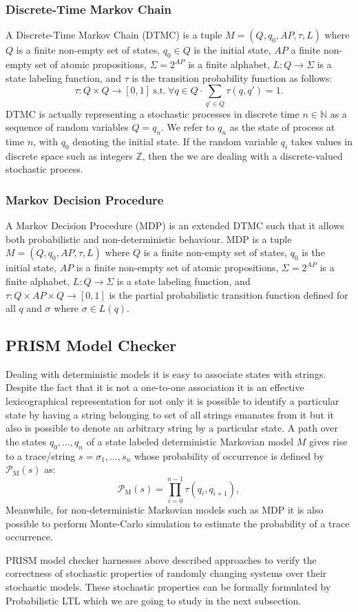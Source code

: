 \documentclass[
a4paper,
12pt
]{scrartcl}
\newcommand\Prob[1]{ \operatorname {\mathcal{P}_{#1}}}
\begin{document}
\subsubsection{Discrete-Time Markov Chain}
\par A Discrete-Time Markov Chain (DTMC) is a tuple $M=(Q,q_0,AP,\tau,L)$ where $Q$ is a finite non-empty set of states, $q_0\in Q$ is the initial state, $AP$ a finite non-empty set of atomic propositions, $\Sigma=2^{AP}$ is a finite alphabet, $L:Q\to \Sigma$ is a state labeling function, and $\tau$ is the transition probability function as follows:
\begin{equation*}
  \tau: Q\times Q \to [0,1]~\text{s.t.}~\forall q \in Q \cdot \sum_{q'\in Q}\tau(q,q')=1.
\end{equation*}
DTMC is actually representing a stochastic processes in discrete time $n \in \mathbb{N}$ as a sequence of random variables $Q={q_n}$. We refer to $q_n$ as the state of process at time $n$, with $q_0$ denoting the initial state. If the random variable $q_i$ takes values in discrete space such as integers $\mathbb{Z}$, then the we are dealing with a discrete-valued stochastic process.
\subsubsection{Markov Decision Procedure}
A Markov Decision Procedure (MDP) is an extended DTMC such that it allows both probabilistic and non-deterministic behaviour. MDP is a tuple $M=(Q, q_0, AP, \tau, L)$ where $Q$ is a finite non-empty set of states, $q_0$ is the initial state, $AP$ is a finite non-empty set of atomic propositions, $\Sigma = 2^{AP}$ is a finite alphabet, $L:Q \to \Sigma$ is a state labeling function, and $\tau: Q \times AP \times Q \to [0,1]$ is the partial probabilistic transition function defined for all $q$ and $\sigma$ where $\sigma \in L(q)$.
\subsection{PRISM Model Checker}
Dealing with deterministic models it is easy to associate states with strings. Despite the fact that it is not a one-to-one association it is an effective lexicographical representation for not only it is possible to identify a particular state by having a string belonging to set of all strings emanates from it but it also is possible to denote an arbitrary string by a particular state.
A path over the states $q_0, \dots, q_n$ of a state labeled deterministic Markovian model $M$ gives rise to a trace/string $s = \sigma_1, \dots, s_n$ whose probability of occurrence is defined by $\Prob{M}(s)$ as:
\begin{equation*}
  \Prob{M}(s) = \prod_{i=0}^{n-1}\tau(q_i,q_{i+1}),
\end{equation*}
Meanwhile, for non-deterministic Markovian models such as MDP it is also possible to perform Monte-Carlo simulation to estimate the probability of a trace occurrence.
\par PRISM model checker harnesses above described approaches to verify the correctness of stochastic properties of randomly changing systems over their stochastic models. These stochastic properties can be formally formulated by Probabilistic LTL which we are going to study in the next subsection.
\end{document}
